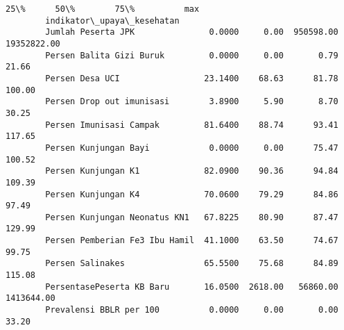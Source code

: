 \documentclass[11pt]{article}
\begin{document}
\begin{Verbatim}[commandchars=\\\{\}]
                                            25\%      50\%        75\%          max  
        indikator\_upaya\_kesehatan                                                 
        Jumlah Peserta JPK               0.0000     0.00  950598.00  19352822.00  
        Persen Balita Gizi Buruk         0.0000     0.00       0.79        21.66  
        Persen Desa UCI                 23.1400    68.63      81.78       100.00  
        Persen Drop out imunisasi        3.8900     5.90       8.70        30.25  
        Persen Imunisasi Campak         81.6400    88.74      93.41       117.65  
        Persen Kunjungan Bayi            0.0000     0.00      75.47       100.52  
        Persen Kunjungan K1             82.0900    90.36      94.84       109.39  
        Persen Kunjungan K4             70.0600    79.29      84.86        97.49  
        Persen Kunjungan Neonatus KN1   67.8225    80.90      87.47       129.99  
        Persen Pemberian Fe3 Ibu Hamil  41.1000    63.50      74.67        99.75  
        Persen Salinakes                65.5500    75.68      84.89       115.08  
        PersentasePeserta KB Baru       16.0500  2618.00   56860.00   1413644.00  
        Prevalensi BBLR per 100          0.0000     0.00       0.00        33.20  
\end{Verbatim}
            
\end{document}

